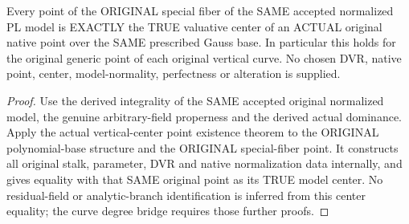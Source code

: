 \begin{theorem}
\label{local:original-normalized-pl-vertical-center-realization}
\leanok
{}
Every point of the ORIGINAL special fiber of the SAME accepted normalized PL
model is EXACTLY the TRUE valuative center of an ACTUAL original native point
over the SAME prescribed Gauss base. In particular this holds for the original
generic point of each original vertical curve. No chosen DVR, native point,
center, model-normality, perfectness or alteration is supplied.
\end{theorem}
\begin{proof}
Use the derived integrality of the SAME accepted original normalized model,
the genuine arbitrary-field properness and the derived actual dominance.
Apply the actual vertical-center point existence theorem to the ORIGINAL
polynomial-base structure and the ORIGINAL special-fiber point. It constructs
all original stalk, parameter, DVR and native normalization data internally,
and gives equality with that SAME original point as its TRUE model center.
No residual-field or analytic-branch identification is inferred from this
center equality; the curve degree bridge requires those further proofs.
\end{proof}
